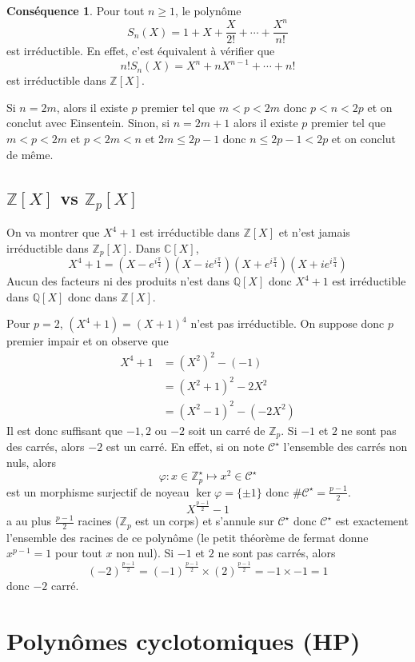 \documentclass{article}
\theoremstyle{definition}
\newtheorem{csq}{Conséquence}[subsection]
\begin{document}
\begin{csq}
Pour tout $n\geq 1$, le polynôme \[
    S_n(X)=1+X+\frac{X}{2!}+\cdots +\frac{X^n}{n!}
\]
est irréductible. En effet, c'est équivalent à vérifier que \[
    n!S_n(X)=X^n+nX^{n-1}+\cdots+n!
\]
est irréductible dans $\mathbb Z[X]$.

Si $n=2m$, alors il existe $p$ premier tel que $m<p<2m$ donc $p<n<2p$ et on conclut avec Einsentein. Sinon, si $n=2m+1$ alors il existe $p$ premier tel que $m<p<2m$ et $p<2m<n$ et $2m\leq 2p-1$ donc $n\leq 2p-1<2p$ et on conclut de même.
\end{csq}

\subsection{$\mathbb Z[X]$ vs $\mathbb Z_p[X]$}

On va montrer que $X^4+1$ est irréductible dans $\mathbb Z[X]$ et n'est jamais irréductible dans $\mathbb Z_p[X]$. Dans $\mathbb C[X]$, \[
    X^4+1=\left(X-e^{i\frac\pi4}\right)\left(X-ie^{i\frac\pi4}\right)\left(X+e^{i\frac\pi4}\right)\left(X+ie^{i\frac\pi4}\right)
\]
Aucun des facteurs ni des produits n'est dans $\mathbb Q[X]$ donc $X^4+1$ est irréductible dans $\mathbb Q[X]$ donc dans $\mathbb Z[X]$.

Pour $p=2$, $(X^4+1)=(X+1)^4$ n'est pas irréductible. On suppose donc $p$ premier impair et on observe que \begin{align*}
    X^4+1&=(X^2)^2-(-1)\\&=(X^2+1)^2-2X^2\\&=(X^2-1)^2-(-2X^2)
\end{align*}
Il est donc suffisant que $-1, 2$ ou $-2$ soit un carré de $\mathbb Z_p$. Si $-1$ et $2$ ne sont pas des carrés, alors $-2$ est un carré. En effet, si on note $\mathcal C^\star$ l'ensemble des carrés non nuls, alors \[
    \varphi: x\in\mathbb Z_p^\star \longmapsto x^2\in\mathcal C^\star
\]
est un morphisme surjectif de noyeau $\ker \varphi=\{\pm1\}$ donc $\#\mathcal C^\star=\frac{p-1}2$. \[
    X^{\frac{p-1}2}-1
\]
a au plus $\frac{p-1}2$ racines ($\mathbb Z_p$ est un corps) et s'annule sur $\mathcal C^\star$ donc $\mathcal C^\star$ est exactement l'ensemble des racines de ce polynôme (le petit théorème de fermat donne $x^{p-1}=1$ pour tout $x$ non nul). Si $-1$ et $2$ ne sont pas carrés, alors \[
    (-2)^{\frac{p-1}2}=(-1)^{\frac{p-1}2}\times (2)^{\frac{p-1}2}=-1\times -1=1
\]
donc $-2$ carré.

\section{Polynômes cyclotomiques (HP)}
\end{document}
